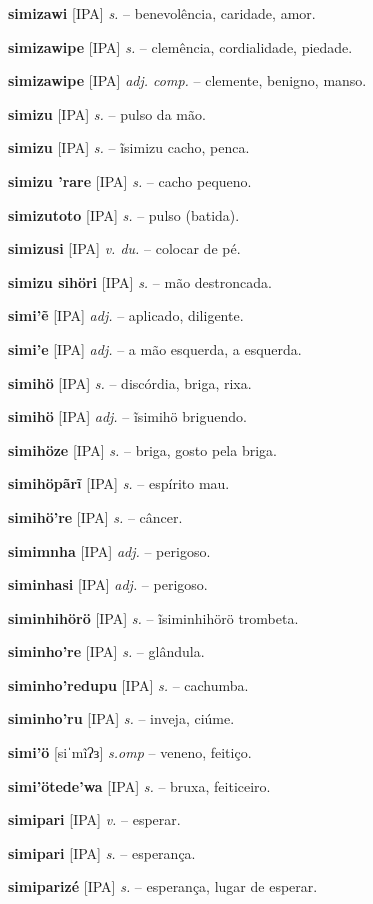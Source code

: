 {\textbf{simizawi} [IPA] \textit{s.} -- benevolência, caridade, amor.

\textbf{simizawipe} [IPA] \textit{s.} -- clemência, cordialidade, piedade.

\textbf{simizawipe} [IPA] \textit{adj. comp.} -- clemente, benigno, manso.

\textbf{simizu} [IPA] \textit{s.} -- pulso da mão.

\textbf{simizu} [IPA] \textit{s.} -- ĩsimizu cacho, penca.

\textbf{simizu 'rare} [IPA] \textit{s.} -- cacho pequeno.

\textbf{simizutoto} [IPA] \textit{s.} -- pulso (batida).

\textbf{simizusi} [IPA] \textit{v. du.} -- colocar de pé.

\textbf{simizu sihöri} [IPA] \textit{s.} -- mão destroncada.

\textbf{simi'ẽ} [IPA] \textit{adj.} -- aplicado, diligente.

\textbf{simi'e} [IPA] \textit{adj.} -- a mão esquerda, a esquerda.

\textbf{simihö} [IPA] \textit{s.} -- discórdia, briga, rixa.

\textbf{simihö} [IPA] \textit{adj.} -- ĩsimihö briguendo.

\textbf{simihöze} [IPA] \textit{s.} -- briga, gosto pela briga.

\textbf{simihöpãrĩ} [IPA] \textit{s.} -- espírito mau.

\textbf{simihö're} [IPA] \textit{s.} -- câncer.

\textbf{simimnha} [IPA] \textit{adj.} -- perigoso.

\textbf{siminhasi} [IPA] \textit{adj.} -- perigoso.

\textbf{siminhihörö} [IPA] \textit{s.} -- ĩsiminhihörö trombeta.

\textbf{siminho're} [IPA] \textit{s.} -- glândula.

\textbf{siminho'redupu} [IPA] \textit{s.} -- cachumba.

\textbf{siminho'ru} [IPA] \textit{s.} -- inveja, ciúme.

\textbf{simi'ö} [siˈmĩʔɜ] \textit{s.omp} -- veneno, feitiço.

\textbf{simi'ötede'wa} [IPA] \textit{s.} -- bruxa, feiticeiro.

\textbf{simipari} [IPA] \textit{v.} -- esperar.

\textbf{simipari} [IPA] \textit{s.} -- esperança.

\textbf{simiparizé} [IPA] \textit{s.} -- esperança, lugar de esperar.

}
